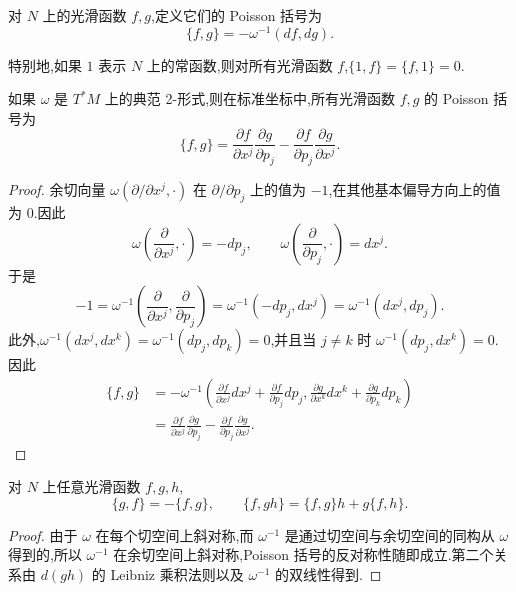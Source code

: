 \begin{definition}[Poisson 括号]\label{def:poisson-bracket-manifold}
对 $N$ 上的光滑函数 $f,g$,定义它们的 Poisson 括号为
\[
 \{f,g\}=-\omega^{-1}(df,dg).
\]
\end{definition}

特别地,如果 $1$ 表示 $N$ 上的常函数,则对所有光滑函数 $f$,$\{1,f\}=\{f,1\}=0$.

\begin{example}\label{ex:cotangent-poisson}
如果 $\omega$ 是 $T^*M$ 上的典范 2-形式,则在标准坐标中,所有光滑函数 $f,g$ 的 Poisson 括号为
\[
 \{f,g\}
 =\frac{\partial f}{\partial x^j}\frac{\partial g}{\partial p_j}
 -\frac{\partial f}{\partial p_j}\frac{\partial g}{\partial x^j}.
\]
\end{example}

\begin{proof}
余切向量 $\omega(\partial/\partial x^j,\cdot)$ 在 $\partial/\partial p_j$ 上的值为 $-1$,在其他基本偏导方向上的值为 $0$.因此
\[
 \omega\left(\frac{\partial}{\partial x^j},\cdot\right)=-dp_j,
\qquad
 \omega\left(\frac{\partial}{\partial p_j},\cdot\right)=dx^j.
\]
于是
\[
 -1=\omega^{-1}\left(\frac{\partial}{\partial x^j},
 \frac{\partial}{\partial p_j}\right)
 =\omega^{-1}(-dp_j,dx^j)
 =\omega^{-1}(dx^j,dp_j).
\]
此外,$\omega^{-1}(dx^j,dx^k)=\omega^{-1}(dp_j,dp_k)=0$,并且当 $j\ne k$ 时 $\omega^{-1}(dp_j,dx^k)=0$.因此
\[
\begin{aligned}
 \{f,g\}
 &=-\omega^{-1}\left(
 \frac{\partial f}{\partial x^j}dx^j+\frac{\partial f}{\partial p_j}dp_j,
 \frac{\partial g}{\partial x^k}dx^k+\frac{\partial g}{\partial p_k}dp_k\right)\\
 &=\frac{\partial f}{\partial x^j}\frac{\partial g}{\partial p_j}
 -\frac{\partial f}{\partial p_j}\frac{\partial g}{\partial x^j}.
\end{aligned}
\]
\end{proof}

\begin{proposition}\label{prop:poisson-properties}
对 $N$ 上任意光滑函数 $f,g,h$,
\[
 \{g,f\}=-\{f,g\},
\qquad
 \{f,gh\}=\{f,g\}h+g\{f,h\}.
\]
\end{proposition}

\begin{proof}
由于 $\omega$ 在每个切空间上斜对称,而 $\omega^{-1}$ 是通过切空间与余切空间的同构从 $\omega$ 得到的,所以 $\omega^{-1}$ 在余切空间上斜对称,Poisson 括号的反对称性随即成立.第二个关系由 $d(gh)$ 的 Leibniz 乘积法则以及 $\omega^{-1}$ 的双线性得到.
\end{proof}

